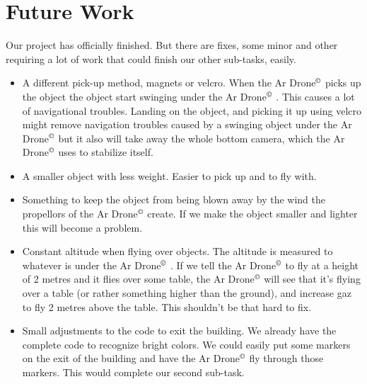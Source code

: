 \documentclass[a4paper,10pt]{article}
\newcommand{\Ardrone}{Ar Drone$^{\copyright}$ }
\begin{document}
\section{Future Work}
Our project has officially finished. But there are fixes, some minor and other requiring a lot of work that could finish our other sub-tasks, easily. 
\begin{itemize}
    \item A different pick-up method, magnets or velcro. When the \Ardrone picks up the object the object start swinging under the \Ardrone. This causes a lot of
navigational troubles. Landing on the object, and picking it up using velcro might remove navigation troubles caused by a swinging object under the \Ardrone but it 
also will take away the whole bottom camera, which the \Ardrone uses to stabilize itself.
    \item A smaller object with less weight. Easier to pick up and to fly with. 
    \item Something to keep the object from being blown away by the wind the propellors of the \Ardrone create. If we make the object smaller and lighter this will 
become a problem.
    \item Constant altitude when flying over objects. The altitude is measured to whatever is under the \Ardrone. If we tell the \Ardrone to fly at a height of 2 metres
and it flies over some table, the \Ardrone will see that it's flying over a table (or rather something higher than the ground), and increase gaz to fly 2 metres above
the table. This shouldn't be that hard to fix. 
    \item Small adjustments to the code to exit the building. We already have the complete code to recognize bright colors. We could easily put some markers on the
exit of the building and have the \Ardrone fly through those markers. This would complete our second sub-task.
\end{itemize}
\end{document}

